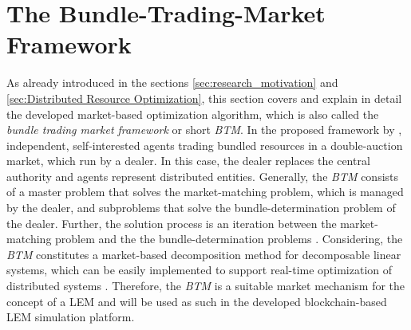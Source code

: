 \section{The Bundle-Trading-Market Framework}
As already introduced in the sections \ref{sec:research_motivation} 
and \ref{sec:Distributed Resource Optimization}, this section covers and explain in detail
the developed market-based optimization algorithm, which is also called the 
\textit{bundle trading market framework} or short \textit{BTM}. 
In the proposed framework by , independent, self-interested
agents trading bundled resources in a double-auction market, which run by a dealer. 
In this case, the dealer replaces the central authority and agents represent distributed
entities. Generally, the \textit{BTM} consists of a master problem that solves 
the market-matching problem, which is managed by the dealer, 
and  subproblems that solve the bundle-determination problem of the dealer.
Further, the solution process is an iteration between the market-matching problem and the 
the bundle-determination problems .
Considering, the \textit{BTM} constitutes a market-based decomposition method for decomposable linear systems,
which can be easily implemented to support real-time optimization of distributed systems .
Therefore, the \textit{BTM} is a suitable market mechanism for the concept of a LEM and will be used
as such in the developed blockchain-based LEM simulation platform. 


